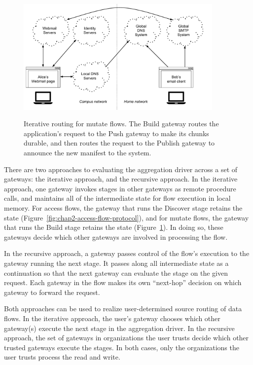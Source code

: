 \begin{figure}[h!]
   \caption{Iterative routing for mutate flows.  The Build gateway routes the
   application's request to the Push gateway to make its chunks durable, and
   then routes the request to the Publish gateway to announce the new manifest
   to the system.}
   \centering
   \includegraphics[width=0.9\textwidth,page=10]{figures/dissertation-figures}
   \label{fig:chap2-mutate-flow-protocol}
\end{figure}

There are two approaches to evaluating the aggregation driver across a set of
gateways:  the iterative approach, and the recursive approach.
In the iterative approach, one gateway invokes stages in other gateways as
remote procedure calls, and maintains all of the intermediate state for flow
execution in local memory.  For access flows, the gateway that runs the Discover
stage retains the state (Figure~\ref{fig:chap2-access-flow-protocol}), and for
mutate flows, the gateway that runs the Build stage retains the state
(Figure~\ref{fig:chap2-mutate-flow-protocol}).  In doing so, these gateways
decide which other gateways are involved in processing the flow.

In the recursive approach, a gateway passes control of the flow's execution
to the gateway running the next stage.  It passes along all intermediate
state as a continuation so that the next gateway can evaluate the stage on the
given request.  Each gateway in the flow makes its own
``next-hop'' decision on which gateway to forward the request.

Both approaches can be used to realize user-determined source routing of data
flows.  In the iterative approach, the user's gateway chooses which other gateway(s) execute
the next stage in the aggregation driver.  In the recursive approach, the set of
gateways in organizations the user trusts decide which other trusted gateways
execute the stages.  In both cases, only the organizations the user trusts
process the read and write.

